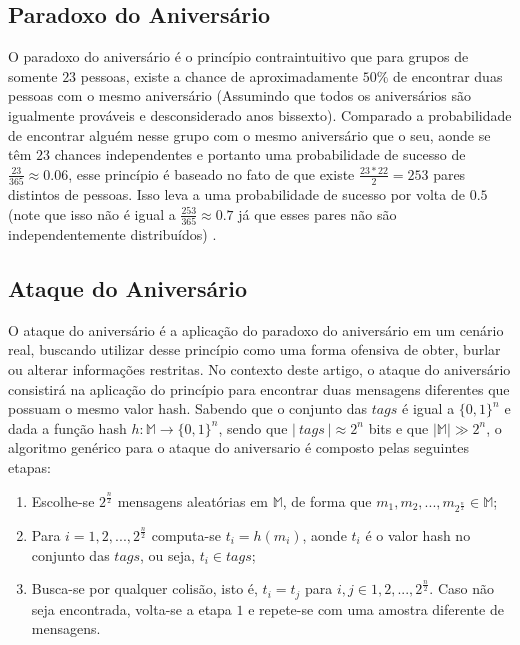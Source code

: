 \documentclass[12pt]{article}
\begin{document}
\subsection{Paradoxo do Aniversário}

O paradoxo do aniversário é o princípio contraintuitivo que para grupos de somente \(23\) pessoas, existe a 
chance de aproximadamente \(50\%\) de encontrar duas pessoas com o mesmo aniversário (Assumindo que
todos os aniversários são igualmente prováveis e desconsiderado anos bissexto). Comparado a probabilidade
de encontrar alguém nesse grupo com o mesmo aniversário que o seu, aonde se têm \(23\) chances independentes
e portanto uma probabilidade de sucesso de \(\frac{23}{365} \approx 0.06\), esse princípio é baseado
no fato de que existe \(\frac{23 * 22}{2} = 253\) pares distintos de pessoas. Isso leva a uma probabilidade
de sucesso por volta de \(0.5\) (note que isso não é igual a \(\frac{253}{365} \approx 0.7\) já que esses
pares não são independentemente distribuídos) \cite{stevens2012attacks}.

\subsection{Ataque do Aniversário}

O ataque do aniversário é a aplicação do paradoxo do aniversário em um cenário real, buscando utilizar desse princípio
como uma forma ofensiva de obter, burlar ou alterar informações restritas. No contexto deste artigo, o ataque do aniversário
consistirá na aplicação do princípio para encontrar duas mensagens diferentes que possuam o mesmo valor hash. Sabendo que
o conjunto das \(tags\) é igual a \(\{0,1\}^n\) e dada a função hash \(h : \mathbb{M} \to \{0,1\}^n\), sendo que \(|\ tags\ | 
\approx 2^n\) bits e que \(| \mathbb{M} | \gg 2^n\), o algoritmo genérico para o ataque do aniversario é composto pelas seguintes 
etapas:
\begin{enumerate}
\item Escolhe-se \(2^\frac{n}{2}\) mensagens aleatórias em \(\mathbb{M}\), de forma que \(m_1, m_2, ... , m_{2^\frac{n}{2}}
\in \mathbb{M}\);
\item Para \(i = 1,2, ... , 2^\frac{n}{2}\) computa-se \(t_i = h(m_i)\), aonde \(t_i\) é o valor hash no conjunto das \(tags\),
ou seja, \(t_i \in tags\); 
\item Busca-se por qualquer colisão, isto é, \(t_i = t_j\) para \(i, j \in {1, 2, ... , 2^\frac{n}{2}}\). Caso não seja 
encontrada, volta-se a etapa \(1\) e repete-se com uma amostra diferente de mensagens.
\end{enumerate}
\end{document}
